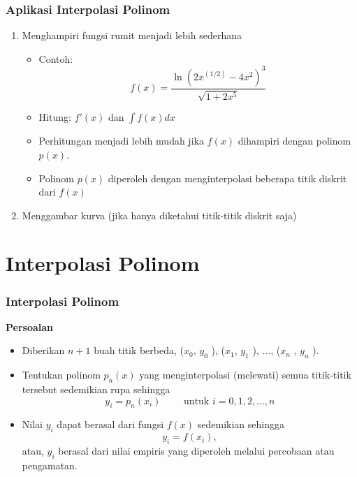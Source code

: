 \documentclass[pdflatex,compress,mathserif]{beamer}
\begin{document}
\begin{frame}
	\frametitle{Aplikasi Interpolasi Polinom}
	\begin{enumerate}
		\item Menghampiri fungsi rumit menjadi lebih sederhana
		\begin{itemize}
			\item Contoh: \[ f(x) = \frac{\ln(2x^{(1/2)}-4x^2)^3}{\sqrt{1+2x^5}} \]
			\item[] Hitung: $ f'(x) $ dan $\int f(x) dx$
			\item Perhitungan menjadi lebih mudah jika $ f(x) $ dihampiri dengan polinom $ p(x) $.
			\item Polinom $ p(x) $ diperoleh dengan menginterpolasi beberapa titik diskrit dari $ f(x) $
		\end{itemize}
		\item Menggambar kurva (jika hanya diketahui titik-titik diskrit saja)
	\end{enumerate}
\end{frame}

\section{Interpolasi Polinom}

\begin{frame}
	\frametitle{Interpolasi Polinom}
	\textbf{Persoalan}
	\begin{itemize}
		\item Diberikan $ n+1 $ buah titik berbeda, ($ x_0 $, $ y_0 $ ), ($ x_1 $, $ y_1 $ ), $\dots$, ($ x_n $ , $ y_n $ ).
		\item Tentukan polinom $ p_n(x) $ yang menginterpolasi (melewati) semua titik-titik tersebut sedemikian rupa sehingga
		\[ y_i = p_n(x_i)\qquad \text{ untuk } i = 0,1,2,\dots,n \]
		\item Nilai $ y_i $ dapat berasal dari fungsi $ f(x) $ sedemikian sehingga \[ y_i = f(x_i), \] atau, $ y_i $ berasal dari nilai empiris yang diperoleh melalui percobaan atau pengamatan.
	\end{itemize}
\end{frame}
\end{document}
